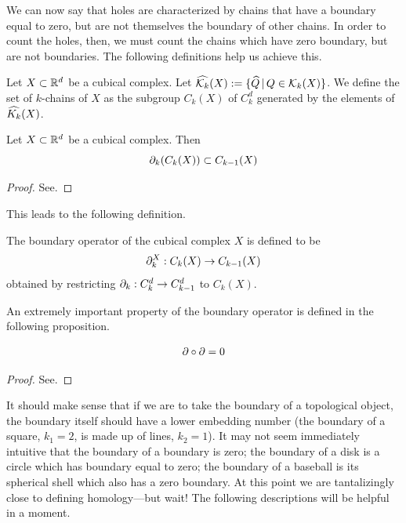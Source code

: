 We can now say that holes are characterized by chains that have a boundary equal to zero, but are not themselves the boundary of other chains. In order to count the holes, then, we must count the chains which have zero boundary, but are not boundaries. The following definitions help us achieve this.

\begin{defn}
	Let $X \subset \mathbb{R}^d$ be a cubical complex. Let $\widehat{\mathcal{K}_k}(X) := \{ \widehat{Q} \, | \, Q \in \mathcal{K}_k(X) \}$. We define the set of $k$-chains of $X$ as the subgroup $C_k(X)$ of $C_k^d$ generated by the elements of $\widehat{K_k}(X)$.
\end{defn}

\begin{prop}
	Let $X \subset \mathbb{R}^d$ be a cubical complex. Then
	$$ \partial_k (C_k(X)) \subset C_{k-1}(X) $$
\end{prop}

\begin{proof}
	See.
\end{proof}
%
This leads to the following definition.

\begin{defn}
	The boundary operator of the cubical complex $X$ is defined to be
	$$ \partial_k^X : C_k(X) \rightarrow C_{k-1}(X) $$
	obtained by restricting $\partial_k : C_k^d \rightarrow C_{k-1}^d$ to $C_k(X)$.
\end{defn}

An extremely important property of the boundary operator is defined in the following proposition.

\begin{prop} \label{prop:bdofbd}
	$$\partial \circ \partial = 0$$
\end{prop}

\begin{proof}
	See.
\end{proof}

It should make sense that if we are to take the boundary of a topological object, the boundary itself should have a lower embedding number (the boundary of a square, $k_1=2$, is made up of lines, $k_2=1$). It may not seem immediately intuitive that the boundary of a boundary is zero; the boundary of a disk is a circle which has boundary equal to zero; the boundary of a baseball is its spherical shell which also has a zero boundary. At this point we are tantalizingly close to defining homology---but wait! The following descriptions will be helpful in a moment.

